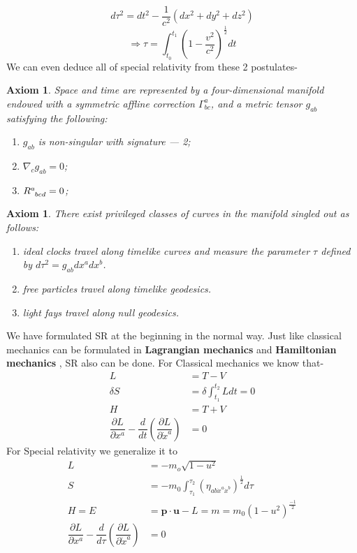 \documentclass[12pt,a4paper]{article}
\numberwithin{table}{section}
\numberwithin{figure}{section}
\numberwithin{equation}{section}
\newtheorem{axiom}[theorem]{Axiom}
\theoremstyle{remark}
\theoremstyle{definition}
\begin{document}
$$ d\tau^2=dt^2-\frac{1}{c^2}(dx^2+dy^2+dz^2) $$
\begin{equation}
   \Rightarrow \tau=\int^{t_1}_{t_0}\left(1-\frac{v^2}{c^2}\right)^{\frac{1}{2}}dt
\end{equation}
We can even deduce all of special relativity from these 2 postulates-
\begin{axiom}
Space and time are represented by a four-dimensional manifold endowed with a symmetric affline correction $\Gamma^a_{bc}$, and a metric tensor $g_{ab}$ satisfying the following:
\begin{enumerate}
    \item $g_{ab}$ is non-singular with signature — 2; 
    \item $\nabla_c g_{ab}=0$;
    \item $\tensor{R}{^a_{bcd}}=0$;
\end{enumerate}
\end{axiom}
\begin{axiom}
There exist privileged classes of curves in the manifold singled out as follows: 
\begin{enumerate}
    \item ideal clocks travel along timelike curves and measure the parameter $\tau$ defined by $d\tau^2=g_{ab}dx^adx^b$.
    \item free particles travel along timelike geodesics.
    \item light fays travel along null geodesics. 
\end{enumerate}
\end{axiom}
We have formulated SR at the beginning in the normal way. Just like classical mechanics can be formulated in \textbf{Lagrangian mechanics} and \textbf{Hamiltonian mechanics} , SR also can be done. For Classical mechanics
we know that-
\begin{align}
    L&=T-V\\
    \delta S&=\delta \int^{t_2}_{t_1}Ldt=0\\
    H&=T+V\\
    \dfrac{\partial L}{\partial x^a}-\dfrac{d}{dt}\left(\dfrac{\partial L}{\partial \dot{x}^a} \right)&=0
\end{align}
For Special relativity we generalize it to
\begin{align}
    L&=-m_{o}\sqrt{1-u^2}\\
     S&=-m_0\int^{\tau_2}_{\tau_1}(\eta_{ab\dot{x}^a\dot{x}^b})^{\frac{1}{2}}d\tau\\
    H=E &=\textbf{p}\cdot\textbf{u}-L=m=m_0(1-u^2)^{\frac{-1}{2}}\\
    \dfrac{\partial L}{\partial x^a}-\dfrac{d}{d\tau}\left(\dfrac{\partial L}{\partial \dot{x}^a} \right)&=0
\end{align}
\end{document}
